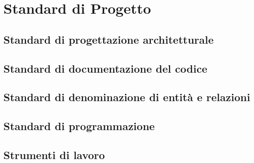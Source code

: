 \section{Standard di Progetto}
\label{sec:standardProgetto}

\subsection{Standard di progettazione architetturale}
\label{sub:Standard di progettazione architetturale}

\subsection{Standard di documentazione del codice}
\label{sub:Standard di documentazione del codice}


\subsection{Standard di denominazione di entità e relazioni}
\label{sub:Standard di denominazione di entità e relazioni}


\subsection{Standard di programmazione}
\label{sub:Standard di programmazione}


\subsection{Strumenti di lavoro}
\label{sub:Strumenti di lavoro}
